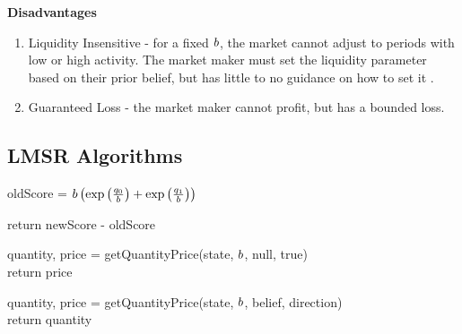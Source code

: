 \textbf{Disadvantages} \\
\begin{enumerate}
\item{Liquidity Insensitive - for a fixed $b$, the market cannot adjust to periods with low or high activity. The market maker must set the liquidity parameter based on their prior belief, but has little to no guidance on how to set it \cite{Othman:2013:PLA:2509413.2509414}.}
\item{Guaranteed Loss - the market maker cannot profit, but has a bounded loss.}
\end{enumerate}

\subsection{LMSR Algorithms}
\begin{algorithm}[H]
\SetAlgoLined
{}
oldScore = $b \left(\exp\left(\frac{{q_0}}{b}\right) + \exp\left(\frac{{q_1}}{b}\right)\right)$\\

return newScore - oldScore\
\end{algorithm}

\begin{algorithm}[H]
\SetAlgoLined
{}
\Output{price}
quantity, price = getQuantityPrice(state, $b$, null, true)\\
return price\\
\end{algorithm}

\begin{algorithm}[H]
\SetAlgoLined
{}
quantity, price = getQuantityPrice(state, $b$, belief, direction)\\
return quantity\\
\end{algorithm}
\newpage

